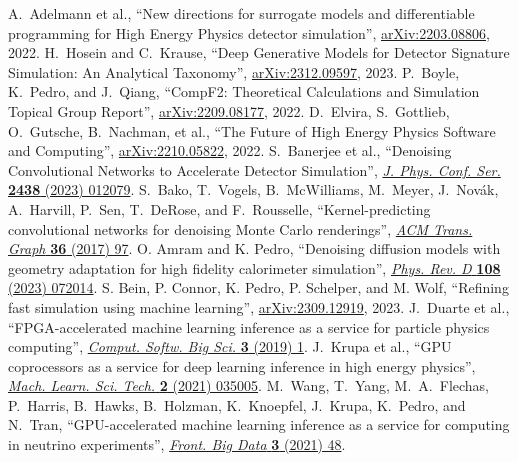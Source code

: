 \begin{thebibliography}{99}
 A.~Adelmann et al., ``New directions for surrogate models and differentiable programming for High Energy Physics detector simulation'', \href{https://arxiv.org/abs/2203.08806}{arXiv:2203.08806}, 2022.
 H.~Hosein and C.~Krause, ``Deep Generative Models for Detector Signature Simulation: An Analytical Taxonomy'', \href{https://arxiv.org/abs/2312.09597}{arXiv:2312.09597}, 2023.
 P.~Boyle, K.~Pedro, and J.~Qiang, ``CompF2: Theoretical Calculations and Simulation Topical Group Report'', \href{https://arxiv.org/abs/2209.08177}{arXiv:2209.08177}, 2022.
 D.~Elvira, S.~Gottlieb, O.~Gutsche, B.~Nachman, et al., ``The Future of High Energy Physics Software and Computing'', \href{https://arxiv.org/abs/2210.05822}{arXiv:2210.05822}, 2022.
 S.~Banerjee et al., ``Denoising Convolutional Networks to Accelerate Detector Simulation'', \href{https://doi.org/10.1088/1742-6596/2438/1/012079}{\textit{J. Phys. Conf. Ser.} \textbf{2438} (2023) 012079}.
 S.~Bako, T.~Vogels, B.~McWilliams, M.~Meyer, J.~Nov\'ak, A.~Harvill, P.~Sen, T.~DeRose, and F.~Rousselle, ``Kernel-predicting convolutional networks for denoising Monte Carlo renderings'', \href{https://doi.org/10.1145/3072959.3073708}{\textit{ACM Trans. Graph} \textbf{36} (2017) 97}.
 O. Amram and K. Pedro, ``Denoising diffusion models with geometry adaptation for high fidelity calorimeter simulation'', \href{https://doi.org/10.1103/PhysRevD.108.072014}{\textit{Phys. Rev. D} \textbf{108} (2023) 072014}.
 S. Bein, P. Connor, K. Pedro, P. Schelper, and M. Wolf, ``Refining fast simulation using machine learning'', \href{https://arxiv.org/abs/2309.12919}{arXiv:2309.12919}, 2023.
 J.~Duarte et al., ``FPGA-accelerated machine learning inference as a service for particle physics computing'', \href{https://doi.org/10.1007/s41781-019-0027-2}{\textit{Comput. Softw. Big Sci.} \textbf{3} (2019) 1}.
 J.~Krupa et al., ``GPU coprocessors as a service for deep learning inference in high energy physics'', \href{https://doi.org/10.1088/2632-2153/abec21}{\textit{Mach. Learn. Sci. Tech.} \textbf{2} (2021) 035005}.
 M.~Wang, T.~Yang, M.~A.~Flechas, P.~Harris, B.~Hawks, B.~Holzman, K.~Knoepfel, J.~Krupa, K.~Pedro, and N.~Tran, ``GPU-accelerated machine learning inference as a service for computing in neutrino experiments'', \href{https://doi.org/10.3389/fdata.2020.604083}{\textit{Front. Big Data} \textbf{3} (2021) 48}.

\end{thebibliography}
